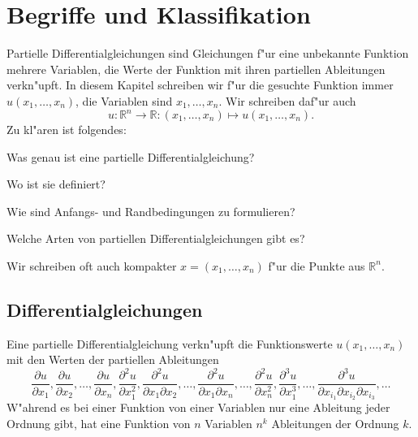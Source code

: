 %
% 
%
%
\chapter{Begriffe und Klassifikation}
Partielle Differentialgleichungen sind Gleichungen f"ur eine
unbekannte Funktion mehrere Variablen, die Werte der Funktion
mit ihren partiellen Ableitungen verkn"upft.
In diesem Kapitel schreiben wir f"ur die gesuchte Funktion immer
$u(x_1,\dots,x_n)$, die Variablen sind $x_1,\dots,x_n$.
Wir schreiben daf"ur auch
\[
u\colon \mathbb R^n\to\mathbb R:(x_1,\dots,x_n)\mapsto u(x_1,\dots,x_n).
\]
Zu kl"aren ist folgendes:
\begin{compactenum}
\item Was genau ist eine partielle Differentialgleichung?
\item Wo ist sie definiert?
\item Wie sind Anfangs- und Randbedingungen zu formulieren?
\item Welche Arten von partiellen Differentialgleichungen gibt es?
\end{compactenum}
Wir schreiben oft auch kompakter $x=(x_1,\dots,x_n)$ f"ur die Punkte
aus $\mathbb R^n$.

\section{Differentialgleichungen\label{klassifikation:differentialgleichungen}}
Eine partielle Differentialgleichung verkn"upft die Funktionswerte
$u(x_1,\dots,x_n)$ mit den Werten der partiellen Ableitungen
\begin{equation}
\frac{\partial u}{\partial x_1},
\frac{\partial u}{\partial x_2},
\dots,
\frac{\partial u}{\partial x_n},
\frac{\partial^2 u}{\partial x_1^2},
\frac{\partial^2 u}{\partial x_1\partial x_2},\dots,
\frac{\partial^2 u}{\partial x_1\partial x_n},\dots,
\frac{\partial^2 u}{\partial x_n^2},
\frac{\partial^3 u}{\partial x_1^3},\dots,
\frac{\partial^3 u}{\partial x_{i_1}\partial x_{i_2}\partial x_{i_3}},\dots
\label{ableitungen}
\end{equation}
W"ahrend es bei einer Funktion von einer Variablen nur eine Ableitung
jeder Ordnung gibt, hat eine Funktion von $n$ Variablen $n^k$ Ableitungen
der Ordnung $k$.

